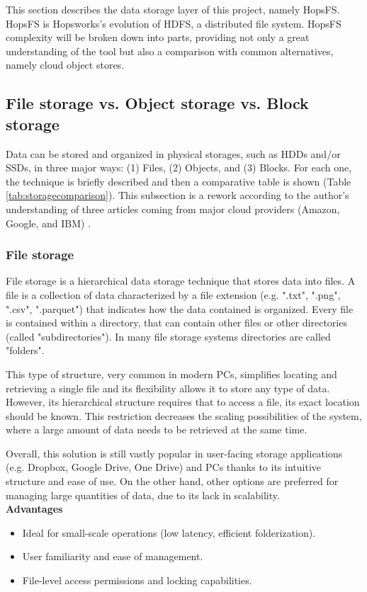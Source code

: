 This section describes the data storage layer of this project, namely \gls{HopsFS}. \gls{HopsFS} is Hopsworks's evolution of \gls{HDFS}, a distributed file system. \gls{HopsFS} complexity will be broken down into parts, providing not only a great understanding of the tool but also a comparison with common alternatives, namely cloud object stores.

\subsection{File storage vs. Object storage vs. Block storage}
\label{subsec:file_vs_obj_vs_block}

Data can be stored and organized in physical storages, such as \glspl{HDD} and/or \glspl{SSD}, in three major ways: (1) Files, (2) Objects, and (3) Blocks. For each one, the technique is briefly described and then a comparative table is shown (Table \ref{tab:storagecomparison}). This subsection is a rework according to the author's understanding of three articles coming from major cloud providers (Amazon, Google, and IBM) \cite{BlockVsFile, HowObjectVs, ObjectVsFile2021}.

\subsubsection*{File storage}

File storage is a hierarchical data storage technique that stores data into files. A file is a collection of data characterized by a file extension (e.g. ".txt", ".png", ".csv", ".parquet") that indicates how the data contained is organized. Every file is contained within a directory, that can contain other files or other directories (called "subdirectories"). In many file storage systems directories are called "folders". 

This type of structure, very common in modern \glspl{PC}, simplifies locating and retrieving a single file and its flexibility allows it to store any type of data. However, its hierarchical structure requires that to access a file, its exact location should be known. This restriction decreases the scaling possibilities of the system, where a large amount of data needs to be retrieved at the same time.

Overall, this solution is still vastly popular in user-facing storage applications (e.g. Dropbox, Google Drive, One Drive) and \glspl{PC} thanks to its intuitive structure and ease of use. On the other hand, other options are preferred for managing large quantities of data, due to its lack in scalability. \\[3mm]
\noindent\textbf{Advantages}
\begin{itemize}
    \item Ideal for small-scale operations (low latency, efficient folderization).
    \item User familiarity and ease of management.
    \item File-level access permissions and locking capabilities.
\end{itemize}

